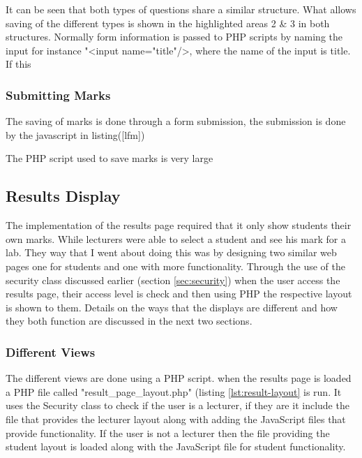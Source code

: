 \documentclass[12pt]{article}  %
\newcommand{\tag}[1]{\textless {#1}\textgreater}
\begin{document}
\noindent It can be seen that both types of questions share a similar structure. What allows saving of the different types is shown in the highlighted areas 2 \& 3 in both structures. Normally form information is passed to PHP scripts by naming the input for instance "\tag{input name="title"/}, where the name of the input is title. If this 



\subsubsection{Submitting Marks}

The saving of marks is done through a form submission, the submission is done by the javascript in listing([lfm])




The PHP script used to save marks is very large




\subsection{Results Display}

The implementation of the results page required that it only show students their own marks. While lecturers were able to select a student and see his mark for a lab. They way that I went about doing this was by designing two similar web pages one for students and one with more functionality. Through the use of the security class discussed earlier (section \ref{sec:security}) when the user access the results page, their access level is check and then using PHP the respective layout is shown to them. Details on the ways that the displays are different and how they both function are discussed in the next two sections.



\subsubsection{Different Views} \label{sec:results-student}

The different views are done using a PHP script. when the results page is loaded a PHP file called "result\_page\_layout.php" (listing \ref{lst:result-layout} is run. It uses the Security class to check if the user is a lecturer, if they are it include the file that provides the lecturer layout along with adding the JavaScript files that provide functionality. If the user is not a lecturer then the file providing the student layout is loaded along with the JavaScript file for student functionality. 
\end{document}
